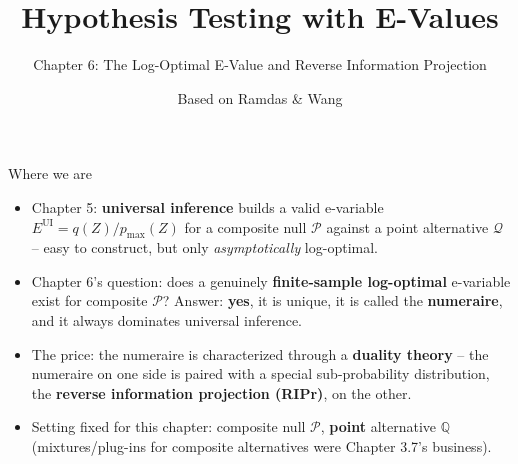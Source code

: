 \documentclass[aspectratio=169,10pt]{beamer}
\title[E-Values -- Ch.6]{Hypothesis Testing with E-Values}
\subtitle{Chapter 6: The Log-Optimal E-Value and Reverse Information Projection}
\author{Based on Ramdas \& Wang}
\date{}
\newcommand{\bQ}{\mathbb{Q}}
\newcommand{\cP}{\mathcal{P}}
\newcommand{\cQ}{\mathcal{Q}}
\begin{document}
\begin{frame}
\titlepage
\end{frame}

\begin{frame}{Where we are}
\begin{itemize}
\item Chapter 5: \textbf{universal inference} builds a valid e-variable
$E^{\mathrm{UI}} = q(Z)/p_{\max}(Z)$ for a composite null $\cP$ against
a point alternative $\cQ$ -- easy to construct, but only
\emph{asymptotically} log-optimal.
\item Chapter 6's question: does a genuinely \textbf{finite-sample
log-optimal} e-variable exist for composite $\cP$? Answer: \textbf{yes},
it is unique, it is called the \textbf{numeraire}, and it always
dominates universal inference.
\item The price: the numeraire is characterized through a
\textbf{duality theory} -- the numeraire on one side is paired with a
special sub-probability distribution, the \textbf{reverse information
projection (RIPr)}, on the other.
\item Setting fixed for this chapter: composite null $\cP$, \textbf{point}
alternative $\bQ$ (mixtures/plug-ins for composite alternatives were
Chapter 3.7's business).
\end{itemize}
\end{frame}
\end{document}
